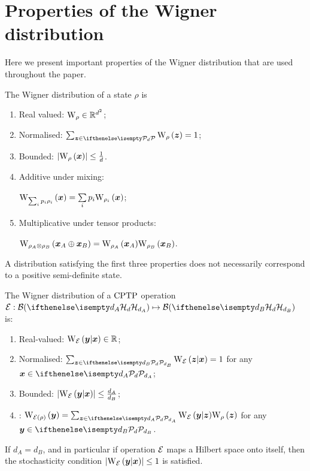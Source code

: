 \section{Properties of the Wigner distribution}
\label{app:wigner}

Here we present important properties of the Wigner distribution that are used throughout the paper.

\begin{proposition}\label{thm:wstate}
    The Wigner distribution of a state $\rho$ is
    \begin{enumerate}
        \item\label{en:w1} Real valued: $\W{\rho} \in \mathbb{R}^{d^2}$;
        \item\label{en:w2} Normalised: $\sum_{\bmz \in \pd} \W[\bmz]{\rho}=1$;
        \item\label{en:w3} Bounded: $\abs{\W[\bmx]{\rho}} \leq \frac{1}{d}$.
        \item\label{en:w4} Additive under mixing:
        
        $\W[\bmx]{\sum_i p_i \rho_i} = \sum\limits_i p_i \W[\bmx]{\rho_i}$;
        \item\label{en:w5} Multiplicative under tensor products: 
        
        $\W[\bmx_A \oplus \bmx_B]{\rho_A \otimes \rho_B} = \W[\bmx_A]{\rho_A}\W[\bmx_B]{\rho_B}$.
	\end{enumerate}
\end{proposition}
A distribution satisfying the first three properties does not necessarily correspond to a positive semi-definite state.

\begin{proposition}
    \label{thm:wchannel}
    The Wigner distribution of a ${\rm{CPTP}}$ operation $\E: \cal{B}(\hd[d_A]) \mapsto \cal{B}(\hd[d_B])$ is:
    \begin{enumerate}
        \item\label{en:wo1} Real-valued: $\W[\bmy|\bmx]{\E} \in \mathbb{R}$;
        \item\label{en:wo2} Normalised: $\sum_{\bmz \in \pd[d_B]} \W[\bmz|\bmx]{\E} = 1$ for any $\bmx \in \pd[d_A]$;
        \item\label{en:wo3} Bounded: $\abs{\W[\bmy|\bmx]{\E}} \leq \frac{d_A}{d_B}$;
	    \item\label{en:wo4} : $\W[\bmy]{\E(\rho)} = \sum_{\bmz \in \pd[d_A]} \W[\bmy|\bmz]{\E} \W[\bmz]{\rho}$ for any $\bmy \in \pd[d_B]$.
    \end{enumerate}
\end{proposition}
If $d_A = d_B$, and in particular if operation $\mathcal{E}$ maps a Hilbert space onto itself, then the stochasticity condition $\abs{\W[\bmy|\bmx]{\E}} \leq 1$ is satisfied.

